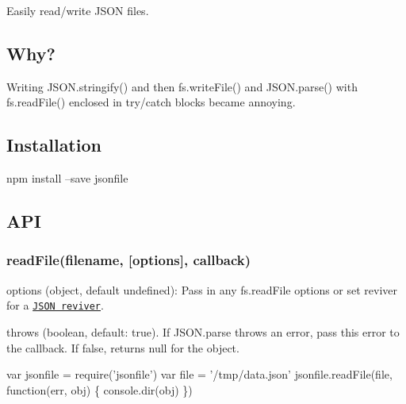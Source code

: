 Easily read/write J\+S\+ON files.

\href{https://www.npmjs.org/package/jsonfile}{\tt } \href{http://travis-ci.org/jprichardson/node-jsonfile}{\tt } \href{https://ci.appveyor.com/project/jprichardson/node-jsonfile/branch/master}{\tt }

\href{https://github.com/feross/standard}{\tt }

\subsection*{Why? }

Writing {\ttfamily J\+S\+O\+N.\+stringify()} and then {\ttfamily fs.\+write\+File()} and {\ttfamily J\+S\+O\+N.\+parse()} with {\ttfamily fs.\+read\+File()} enclosed in {\ttfamily try/catch} blocks became annoying.

\subsection*{Installation }

\begin{DoxyVerb}npm install --save jsonfile
\end{DoxyVerb}


\subsection*{A\+PI }

\subsubsection*{read\+File(filename, \mbox{[}options\mbox{]}, callback)}

{\ttfamily options} ({\ttfamily object}, default {\ttfamily undefined})\+: Pass in any {\ttfamily fs.\+read\+File} options or set {\ttfamily reviver} for a \href{https://developer.mozilla.org/en-US/docs/Web/JavaScript/Reference/Global_Objects/JSON/parse}{\tt J\+S\+ON reviver}.
\begin{DoxyItemize}
\item {\ttfamily throws} ({\ttfamily boolean}, default\+: {\ttfamily true}). If {\ttfamily J\+S\+O\+N.\+parse} throws an error, pass this error to the callback. If {\ttfamily false}, returns {\ttfamily null} for the object.
\end{DoxyItemize}


\begin{DoxyCode}
var jsonfile = require('jsonfile')
var file = '/tmp/data.json'
jsonfile.readFile(file, function(err, obj) \{
  console.dir(obj)
\})
\end{DoxyCode}


